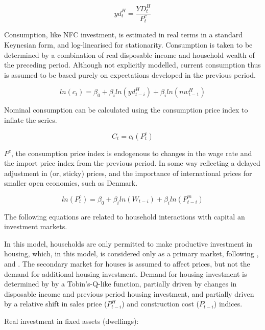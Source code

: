 \documentclass[
]{book}
\begin{document}
\begin{equation}
yd^H_t = \frac{YD^H_t}{P^c_t}
\end{equation}

Consumption, like NFC investment, is estimated in real terms in a standard Keynesian form, and
log-linearised for stationarity. Consumption is taken to be determined by a combination of
real disposable income and household wealth of the preceding period. Although not explicitly
modelled, current consumption thus is assumed to be based purely on expectations developed
in the previous period.

\begin{equation}
ln(c_t) = \beta _0 + \beta _iln(yd^H_{t-i}) + \beta _iln(nw^H_{t-1})
\label{eq:hh_consumption}
\end{equation}

Nominal consumption can be calculated using the consumption price index to inflate the series.

\begin{equation}
C_t = c_t(P^c_t)
\end{equation}

\(P^c\), the consumption price index is endogenous to changes in the wage rate and
the import price index from the previous period. In some way reflecting a delayed adjustment
in (or, sticky) prices, and the importance of international prices for smaller open economies,
such as Denmark.

\begin{equation}
ln(P^c_t) = \beta _0 + \beta _iln(W_{t-i}) + \beta _iln(P^m_{t-i})
\end{equation}

The following equations are related to household interactions with capital an investment
markets.

In this model, households are only permitted to make productive investment in
housing, which, in this model, is considered only as a
primary market, following \citet{Zezza2008}, \citet{fontana2013securitization} and \citet{beckta2015modelling}.
The secondary market for houses is assumed to affect prices, but not the demand
for additional housing investment. Demand for housing investment is determined by
by a Tobin's-Q-like function, partially driven by changes in disposable income and
previous period housing investment, and partially driven by a relative shift in
sales price (\({P^H_{t-i}}\)) and construction cost (\({P^i_{t-i}}\)) indices.

Real investment in fixed assets (dwellings):
\end{document}
